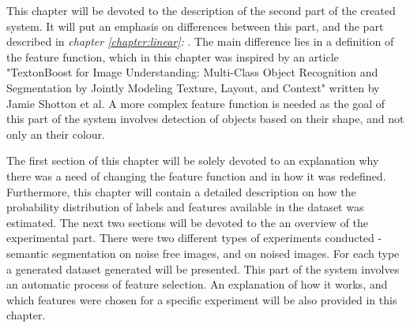 This chapter will be devoted to the description of the second part of the created system. It will put an emphasis on differences between this part, and the part described in \textit{chapter \ref{chapter:linear}: }. The main difference lies in a definition of the feature function, which in this chapter was inspired by an article "TextonBoost for Image Understanding:
Multi-Class Object Recognition and Segmentation by
Jointly Modeling Texture, Layout, and Context" \cite{article_main} written by Jamie Shotton et al. A more complex feature function is needed as the goal of this part of the system involves detection of objects based on their shape, and not only an their colour.

The first section of this chapter will be solely devoted to an explanation why there was a need of changing the feature function and in how it was redefined. Furthermore, this chapter will contain a detailed description on how the probability distribution of labels and features available in the dataset was estimated. The next two sections will be devoted to the an overview of the experimental part. There were two different types of experiments conducted - semantic segmentation on noise free images, and on noised images. For each type a generated dataset generated will be presented. This part of the system involves an automatic process of feature selection. An explanation of how it works, and which features were chosen for a specific experiment will be also provided in this chapter.  